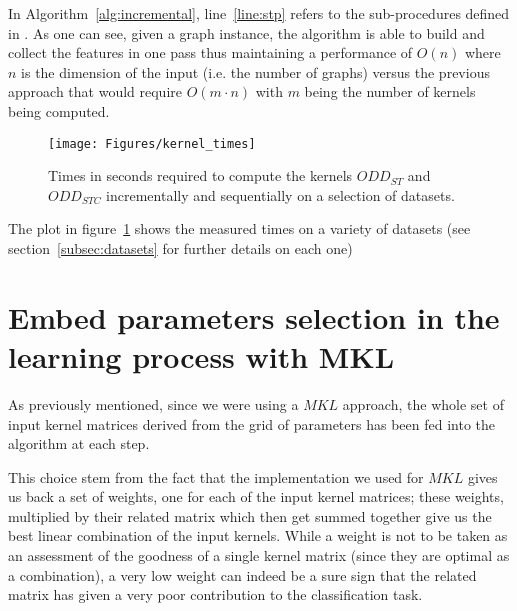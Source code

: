 In Algorithm~\ref{alg:incremental}, line~\ref{line:stp} refers to the sub-procedures
defined in \cite{nnavarin, rtesselli}.
As one can see, given a graph instance, the algorithm is able to build and
collect the features in one pass thus maintaining a performance of $O(n)$ where
$n$ is the dimension of the input (i.e. the number of graphs) versus the
previous approach that would require $O(m \cdot n)$ with $m$ being the number of
kernels being computed.

\begin{figure}[ht]
    \centering
    \texttt{[image: Figures/kernel\_times]}
    \caption{Times in seconds required to compute the kernels $ODD_{ST}$ and 
    $ODD_{STC}$ incrementally and sequentially on a selection of datasets.}
    \label{fig:times}
\end{figure}

The plot in figure~\ref{fig:times} shows the measured times on a variety of
datasets (see section~\ref{subsec:datasets} for further details on each one)


\section{Embed parameters selection in the learning process with MKL}
\label{subsec:parameters}

As previously mentioned, since we were using a $MKL$ approach, the whole set of
input kernel matrices derived from the grid of parameters has been fed into the
algorithm at each step.

This choice stem from the fact that the implementation we used for $MKL$ gives us
back a set of weights, one for each of the input kernel matrices; these weights,
multiplied by their related matrix which then get summed together give us the
best linear combination of the input kernels.
While a weight is not to be taken as an assessment of the goodness of a single
kernel matrix (since they are optimal as a combination), a very low weight can
indeed be a sure sign that the related matrix has given a very poor contribution
to the classification task.


